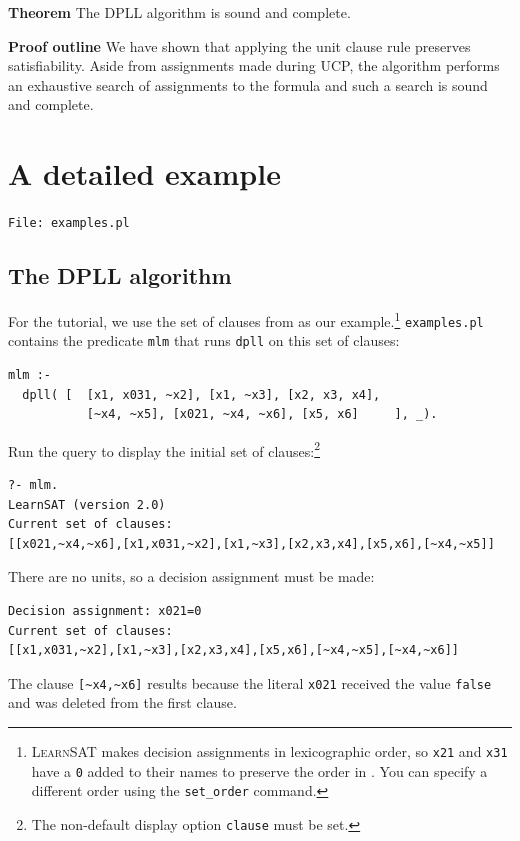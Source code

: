 \documentclass[11pt]{report}
\newcommand*{\p}[1]{\textup{\texttt{#1}}}
\newcommand*{\ls}{\textsc{LearnSAT}}
\newcommand*{\fl}[1]{\parbox{\textwidth}{\raggedleft \p{File: #1}}}
\begin{document}
\bigskip

\textbf{Theorem} The DPLL algorithm is sound and complete.

\textbf{Proof outline} We have shown that applying the unit clause rule preserves satisfiability. Aside from assignments made during UCP, the algorithm performs an exhaustive search of assignments to the formula and such a search is sound and complete.


\newpage

\chapter{A detailed example}\label{ch.mlm}

\fl{examples.pl}

\section{The DPLL algorithm}\label{s.mlm}

For the tutorial, we use the set of clauses from \cite{mlm} as our
example.\footnote{\ls{} makes decision assignments in lexicographic
order, so \p{x21} and \p{x31} have a \p{0} added to their names to
preserve the order in \cite{mlm}. You can specify a different order using the \p{set\_order} command.} \p{examples.pl} contains the predicate \p{mlm} that runs \p{dpll} on this set of clauses:

\begin{verbatim}
mlm :-
  dpll( [  [x1, x031, ~x2], [x1, ~x3], [x2, x3, x4],
           [~x4, ~x5], [x021, ~x4, ~x6], [x5, x6]     ], _).
\end{verbatim}
Run the query to display the initial set of clauses:\footnote{The non-default display option \p{clause} must be set.}
\begin{verbatim}
?- mlm.
LearnSAT (version 2.0)
Current set of clauses:
[[x021,~x4,~x6],[x1,x031,~x2],[x1,~x3],[x2,x3,x4],[x5,x6],[~x4,~x5]]
\end{verbatim}
There are no units, so a decision assignment must be made:
\begin{verbatim}
Decision assignment: x021=0
Current set of clauses:
[[x1,x031,~x2],[x1,~x3],[x2,x3,x4],[x5,x6],[~x4,~x5],[~x4,~x6]]
\end{verbatim}
The clause \verb+[~x4,~x6]+ results because the literal \p{x021} received the value \p{false} and was deleted from the first clause.
\end{document}

